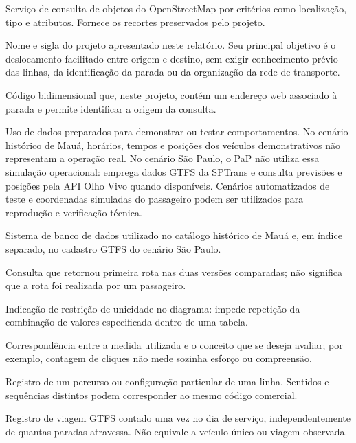\documentclass[12pt,oneside,a4paper,brazil,chapter=TITLE]{abntex2}
\begin{document}
\begin{description}[style=nextline,leftmargin=0pt,labelwidth=0pt,font=\bfseries,itemsep=0.5\baselineskip]
\item[Overpass API] Serviço de consulta de objetos do OpenStreetMap por critérios como localização, tipo e atributos. Fornece os recortes preservados pelo projeto.
\item[PaP (Ponto a Ponto)] Nome e sigla do projeto apresentado neste relatório. Seu principal objetivo é o deslocamento facilitado entre origem e destino, sem exigir conhecimento prévio das linhas, da identificação da parada ou da organização da rede de transporte.
\item[QR Code (Quick Response Code)] Código bidimensional que, neste projeto, contém um endereço web associado à parada e permite identificar a origem da consulta.
\item[Simulação ou dados mockados] Uso de dados preparados para demonstrar ou testar comportamentos. No cenário histórico de Mauá, horários, tempos e posições dos veículos demonstrativos não representam a operação real. No cenário São Paulo, o PaP não utiliza essa simulação operacional: emprega dados GTFS da SPTrans e consulta previsões e posições pela API Olho Vivo quando disponíveis. Cenários automatizados de teste e coordenadas simuladas do passageiro podem ser utilizados para reprodução e verificação técnica.
\item[SQLite] Sistema de banco de dados utilizado no catálogo histórico de Mauá e, em índice separado, no cadastro GTFS do cenário São Paulo.
\item[Sucesso pareado] Consulta que retornou primeira rota nas duas versões comparadas; não significa que a rota foi realizada por um passageiro.
\item[UQ (Unique)] Indicação de restrição de unicidade no diagrama: impede repetição da combinação de valores especificada dentro de uma tabela.
\item[Validade de construção] Correspondência entre a medida utilizada e o conceito que se deseja avaliar; por exemplo, contagem de cliques não mede sozinha esforço ou compreensão.
\item[Variante de linha] Registro de um percurso ou configuração particular de uma linha. Sentidos e sequências distintos podem corresponder ao mesmo código comercial.

\item[Viagem programada distinta] Registro de viagem GTFS contado uma vez no dia de serviço, independentemente de quantas paradas atravessa. Não equivale a veículo único ou viagem observada.
\end{description}
\end{document}
